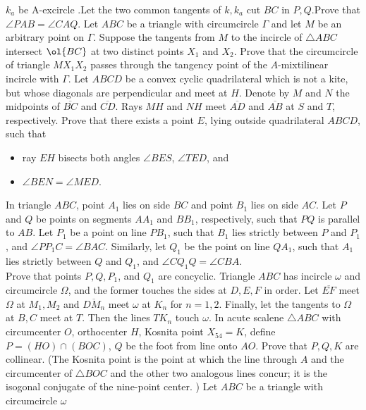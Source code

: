 \documentclass{seto}
\begin{document}
$k_a$ be A-excircle .Let the two common tangents of $k,k_a$ cut $BC$ in
$P,Q$.Prove that $\angle PAB=\angle CAQ$.
Let $ABC$ be a triangle with circumcircle $\Gamma$
and let $M$ be an arbitrary point on $\Gamma$. Suppose the tangents from $M$ to
the incircle of $\triangle ABC$ intersect $\ol{BC}$ at two distinct points $X_1$
and $X_2$. Prove that the circumcircle of triangle $MX_1X_2$ passes through the
tangency point of the $A$-mixtilinear incircle with $\Gamma$.
 Let $ABCD$ be a convex cyclic quadrilateral
which is not a kite, but whose diagonals are perpendicular and meet at $H$.
Denote by $M$ and $N$ the midpoints of $\overline{BC}$ and $\overline{CD}$. Rays
$MH$ and $NH$ meet $\overline{AD}$ and $\overline{AB}$ at $S$ and $T$,
respectively. Prove that there exists a point $E$, lying outside quadrilateral
$ABCD$, such that
\begin{itemize}
\item ray $EH$ bisects both angles $\angle BES$, $\angle TED$, and
\item $\angle BEN = \angle MED$.
\end{itemize}
\exercise[IMO 2019/2] In triangle $ABC$, point $A_1$ lies on side $BC$ and point
$B_1$ lies on side $AC$. Let $P$ and $Q$ be points on segments $AA_1$ and
$BB_1$, respectively, such that $PQ$ is parallel to $AB$. Let $P_1$ be a point
on line $PB_1$, such that $B_1$ lies strictly between $P$ and $P_1$, and $\angle
PP_1C=\angle BAC$. Similarly, let $Q_1$ be the point on line $QA_1$, such that
$A_1$ lies strictly between $Q$ and $Q_1$, and $\angle CQ_1Q=\angle CBA$.
\\[4pt]
Prove that points $P,Q,P_1$, and $Q_1$ are concyclic. 
\exercise[AoPS] Triangle $ABC$ has incircle $\omega$ and circumcircle $\Omega$,
and the former touches the sides at $D,E,F$ in order.  Let $\overline{EF}$ meet
$\Omega$ at $M_1,M_2$ and $\overline{DM_n}$ meet $\omega$ at $K_n$ for $n=1,2$.
Finally, let the tangents to $\Omega$ at $B,C$ meet at $T$. Then the lines
$TK_n$ touch $\omega$.
\exercise[MOP HW \#21] In acute scalene $\triangle ABC$ with circumcenter $O$,
orthocenter $H$, Kosnita point $X_{54}=K$, define $P=(HO)\cap(BOC)$, $Q$ be the
foot from line onto $AO$. Prove that $P,Q,K$ are collinear. (The Kosnita point
is the point at which the line through $A$ and the circumcenter of $\triangle
BOC$ and the other two analogous lines concur; it is the isogonal conjugate of
the nine-point center. )
\exercise[Shortlist 2012/G8] Let $ABC$ be a triangle with circumcircle $\omega$
\end{document}
